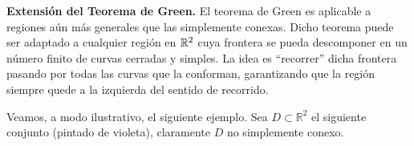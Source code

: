 
\begin{obs}\textbf{Extensión del Teorema de Green.} \label{obs:extension_green}
El teorema de Green es aplicable a regiones aún más generales que las simplemente conexas. Dicho teorema puede ser adaptado a cualquier región en $\mathbb{R}^2$ cuya frontera se pueda descomponer en un número finito de curvas cerradas y simples. La idea es ``recorrer'' dicha frontera pasando por todas las curvas que la conforman, garantizando que la región siempre quede a la izquierda del sentido de recorrido.
\end{obs}

Veamos, a modo ilustrativo,  el siguiente ejemplo. Sea $D \subset \mathbb{R}^{2}$   el siguiente conjunto (pintado de violeta),  claramente $D$  no simplemente conexo. 
    
   

